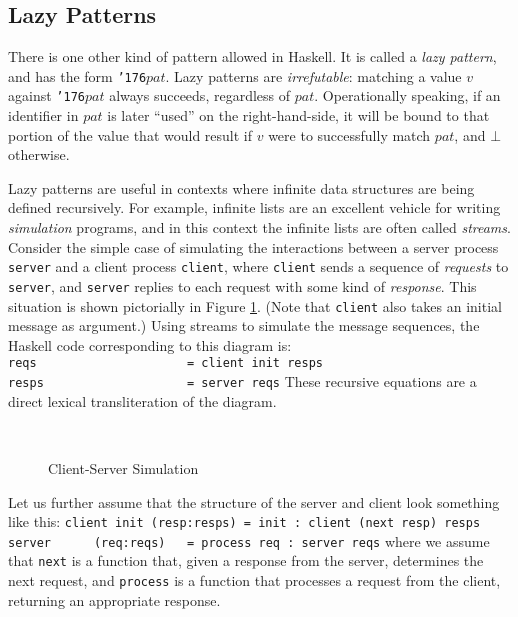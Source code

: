 \subsection{Lazy Patterns}
\label{tut-lazy-patterns}

There is one other kind of pattern allowed in Haskell.  It is called a
{\em lazy pattern}, and has the form \mbox{\tt {\char'176}}$pat$.  Lazy patterns are
{\em irrefutable}: matching a value $v$ against \mbox{\tt {\char'176}}$pat$ always
succeeds, regardless of $pat$.  Operationally speaking, if an
identifier in $pat$ is later ``used'' on the right-hand-side, it will
be bound to that portion of the value that would result if $v$ were to
successfully match $pat$, and $\bot$ otherwise.

Lazy patterns are useful in contexts where infinite data structures are being
defined recursively.  For example, infinite lists are an excellent
vehicle for writing {\em simulation} programs, and in this context the
infinite lists are often called {\em streams}.  Consider the simple
case of simulating the interactions between a server process \mbox{\tt server}
and a client process \mbox{\tt client}, where \mbox{\tt client} sends a sequence of {\em
requests} to \mbox{\tt server}, and \mbox{\tt server} replies to each request with some
kind of {\em response}.  This situation is shown pictorially in Figure
\ref{tut-client-fig}.  (Note that \mbox{\tt client} also takes an initial message as
argument.)
Using
streams to simulate the message sequences, the Haskell code
corresponding to this diagram is:
\bprog
\mbox{\tt reqs\ \ \ \ \ \ \ \ \ \ \ \ \ \ \ \ \ \ \ \ \ =\ client\ init\ resps}\\
\mbox{\tt resps\ \ \ \ \ \ \ \ \ \ \ \ \ \ \ \ \ \ \ \ =\ server\ reqs}
\eprog 
These recursive equations are a direct lexical transliteration of the
diagram.

\begin{figure}
\begin{center}
\mbox{
}
\end{center}
\caption{Client-Server Simulation}
\label{tut-client-fig}
\end{figure}
Let us further assume that the structure of the server and client look
something like this:
\bprog
\mbox{\tt client\ init\ (resp:resps)\ =\ init\ :\ client\ (next\ resp)\ resps}\\
\mbox{\tt server\ \ \ \ \ \ (req:reqs)\ \ \ =\ process\ req\ :\ server\ reqs}
\eprog 
where we assume that \mbox{\tt next} is a function that, given a response from
the server, determines the next request, and \mbox{\tt process} is a function
that processes a request from the client, returning an appropriate
response.

